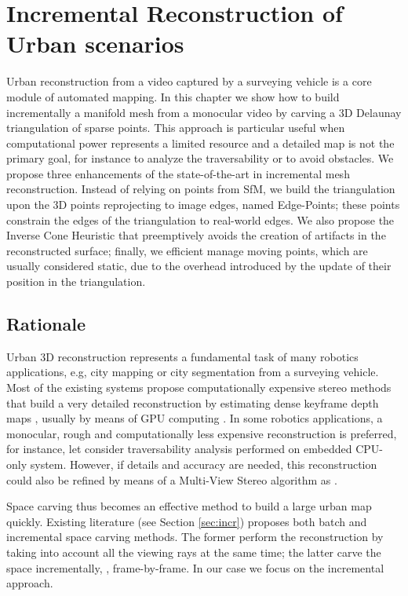 \chapter{Incremental Reconstruction of Urban scenarios}
\label{ch:manif}

Urban reconstruction from a video captured by a surveying vehicle is a core module of automated mapping.
In this chapter we show how to build incrementally a manifold mesh from a monocular video by carving a 3D Delaunay triangulation of sparse points.
This approach is particular useful when computational power represents a limited resource and a detailed map is not the primary goal, for instance to analyze the traversability or to avoid obstacles.
We propose three enhancements of the state-of-the-art in incremental mesh reconstruction.
Instead of relying on points from SfM, we build the triangulation upon the 3D points reprojecting to image edges, named Edge-Points; these points constrain the edges of the triangulation to real-world edges.
We also propose the Inverse Cone Heuristic that preemptively avoids the creation of artifacts in the reconstructed surface; finally, we  efficient manage moving points, which are usually considered static, due to the overhead introduced by the update of their position in the triangulation.

\minitoc


\section{Rationale}
Urban 3D reconstruction represents a fundamental task of many robotics applications, e.g, city mapping \cite{pollefeys_et_al_08} or city segmentation \cite{Hane_et_al_09} from a surveying vehicle.
Most of the existing systems propose computationally expensive stereo methods that build a very detailed reconstruction by estimating dense keyframe depth maps , usually by means of GPU computing \cite{pollefeys_et_al_08,cornelis_et_al08}. 
In some robotics applications, a monocular, rough and computationally less expensive reconstruction is preferred,  for instance, let consider traversability analysis performed on embedded CPU-only system. 
However, if details and accuracy are needed, this reconstruction could also be refined by means of a Multi-View Stereo algorithm as \cite{vu_et_al_2012}.

Space carving \cite{seitz_et_al06} thus becomes an effective method to build  a large urban map quickly. 
Existing literature (see Section \ref{sec:incr}) proposes both batch \cite{Pan_et_al09} and incremental \cite{litvinov_lhuillier_13,lovi_et_al_11} space carving methods.
The former perform the reconstruction by taking into account all the viewing rays at the same time; the latter carve the space incrementally, \ie, frame-by-frame.
In our case we focus on the incremental approach.

